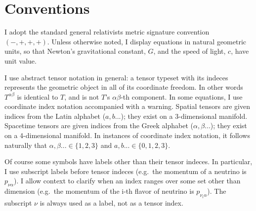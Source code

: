 
\section{Conventions}
\label{sec:conventions}

I adopt the standard general relativists metric signature convention
$(-,+,+,+)$.
Unless otherwise noted, I display equations in natural geometric units, so that
Newton's gravitational constant, $G$, and the speed of light, $c$, have unit
value.

I use abstract tensor notation in general: a tensor typeset with its indeces
represents the geometric object in all of its coordinate freedom. In other words
$T^{\alpha \beta}$ is identical to $T$, and is not $T$'s $\alpha\beta$-th
component.
In some equations, I use coordinate index notation accompanied with a warning.
Spatial tensors are given indices from the Latin alphabet ($a,b...$);
they exist on a 3-dimensional manifold. Spacetime tensors are given indices from
the Greek alphabet ($\alpha,\beta...$); they exist on a 4-dimensional manifold.
In instances of coordinate index notation, it follows naturally that
$\alpha,\beta...\in\{1,2,3\}$ and $a,b...\in\{0,1,2,3\}$.

Of course some symbols have labels other than their tensor indeces.
In particular, I use subscript labels before tensor indeces (e.g.\ the
momentum of a neutrino is $p_{\nu \alpha}$). I allow context to clarify when
an index ranges over some set other than dimension (e.g.\ the momentum of the
i-th flavor of neutrino is $p_{\nu_i \alpha}$). The subscript $\nu$ is always
used as a label, not as a tensor index.

